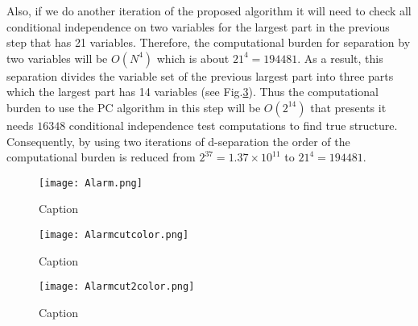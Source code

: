 \documentclass{article}
\begin{document}
Also, if we do another iteration of the proposed algorithm it will need to check all conditional independence on two variables for the largest part in the previous step that has 21 variables. Therefore, the computational burden for separation by two variables will be $O(N^4)$ which is about $21^4=194481$.
As a result, this separation divides the variable set of the previous largest part into three parts which the largest part has 14 variables (see Fig.\ref{Alarm2}). Thus the computational burden to use the PC algorithm in this step will be $O(2^14)$ that presents it needs $16348$ conditional independence test computations to find true structure.
Consequently, by using two iterations of d-separation the order of the computational burden is reduced from $2^{37}=1.37\times 10^{11}$ to $21^{4}=194481$.

\begin{figure}
    \centering
    \texttt{[image: Alarm.png]}
    \caption{Caption}
    \label{Alarm}
\end{figure}

\begin{figure}
    \centering
    \texttt{[image: Alarmcutcolor.png]}
    \caption{Caption}
    \label{Alarm1}
\end{figure}

\begin{figure}
    \centering
    \texttt{[image: Alarmcut2color.png]}
    \caption{Caption}
    \label{Alarm2}
\end{figure}
\end{document}
